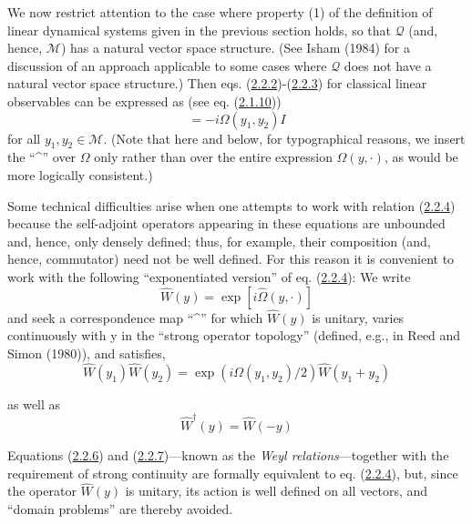 \documentclass[11pt,a4paper]{article}
\begin{document}
We now restrict attention to the case where property (1) of the definition of linear dynamical systems given in the previous section holds, so that \(\mathcal{Q}\) (and, hence, \(\mathcal{M}\)) has a natural vector space structure. (See Isham (1984) for a discussion of an approach applicable to some cases where \(\mathcal{Q}\) does not have a natural vector space structure.) Then eqs. (\hyperref[eq:2.2.2]{2.2.2})-(\hyperref[eq:2.2.3]{2.2.3}) for classical linear observables can be expressed as (see eq. (\hyperref[eq:2.1.10]{2.1.10}))
\begin{equation*}
[\hat{\Omega}(y_1,\cdot), \hat{\Omega}(y_2,\cdot)] = -i \Omega(y_1, y_2) I \tag{2.2.4}\label{eq:2.2.4}
\end{equation*}
for all \(y_1,y_2\in \mathcal{M}\). (Note that here and below, for typographical reasons, we insert the ``\^{}'' over \(\Omega\) only rather than over the entire expression \(\Omega(y,\cdot)\), as would be more logically consistent.)

Some technical difficulties arise when one attempts to work with relation (\hyperref[eq:2.2.4]{2.2.4}) because the self-adjoint operators appearing in these equations are unbounded and, hence, only densely defined; thus, for example, their composition (and, hence, commutator) need not be well defined. For this reason it is convenient to work with the following ``exponentiated version'' of eq. (\hyperref[eq:2.2.4]{2.2.4}): We write
\begin{equation*}
\hat W(y)=\exp[i\widehat\Omega(y,\cdot)]
\tag{2.2.5}\label{eq:2.2.5}
\end{equation*} \hypertarget{source-32}{} and seek a correspondence map ``\^{}'' for which \(\hat{W}(y)\) is unitary, varies continuously with y in the ``strong operator topology'' (defined, e.g., in Reed and Simon (1980)), and satisfies,
\begin{equation*}
\hat{W}(y_1) \hat{W}(y_2) = \exp(i\Omega(y_1, y_2)/2) \hat{W}(y_1 + y_2) \tag{2.2.6}\label{eq:2.2.6}
\end{equation*}

as well as
\begin{equation*}
\hat W^{\dagger}(y)=\hat W(-y)
\tag{2.2.7}\label{eq:2.2.7}
\end{equation*}

Equations (\hyperref[eq:2.2.6]{2.2.6}) and (\hyperref[eq:2.2.7]{2.2.7})---known as the \emph{Weyl relations}---together with the requirement of strong continuity are formally equivalent to eq. (\hyperref[eq:2.2.4]{2.2.4}), but, since the operator \(\hat{W}(y)\) is unitary, its action is well defined on all vectors, and ``domain problems'' are thereby avoided.
\end{document}
